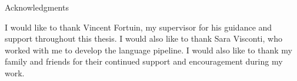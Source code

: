 \thispagestyle{empty}

\vspace*{20mm}

\begin{center}
    { Acknowledgments}
\end{center}

\vspace{10mm}

I would like to thank Vincent Fortuin, my supervisor for his guidance and support throughout this thesis. I would also like to thank Sara Visconti,
who worked with me to develop the language pipeline. I would also like to thank my family and friends for their continued support and encouragement during my work.


\cleardoublepage{}
